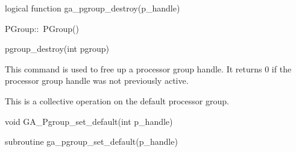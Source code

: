 \documentclass[12pt]{article}
\begin{document}
\begin{fapi}
\begin{fcode}
logical function ga_pgroup_destroy(p_handle)
\end{fcode}
\begin{funcargs}
\end{funcargs}
\end{fapi}

\begin{cxxapi}
\begin{cxxcode}
PGroup::~PGroup()
\end{cxxcode}
\end{cxxapi}

\begin{pyapi}
\begin{pycode}
pgroup_destroy(int pgroup)
\end{pycode}
\begin{funcargs}
\end{funcargs}
\end{pyapi}

\gcoll

\begin{desc}

This command is used to free up a processor group handle. It returns 0 if the
processor group handle was not previously active.

This is a collective operation on the default processor group.

\end{desc}


\begin{capi}
\begin{ccode}
void GA_Pgroup_set_default(int p_handle)
\end{ccode}
\begin{funcargs}
\end{funcargs}
\end{capi}

\begin{fapi}
\begin{fcode}
subroutine ga_pgroup_set_default(p_handle)
\end{fcode}
\begin{funcargs}
\end{funcargs}
\end{fapi}
\end{document}
